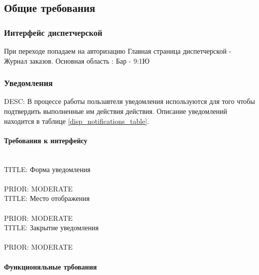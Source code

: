 \subsection{Общие требования}

	\subsubsection{Интерфейс диспетчерской}

		При переходе попадаем на авторизацию
		Главная страница диспетчерской - Журнал заказов. Основная область : Бар - 9:1Ю 





	\subsubsection{Уведомления}

		DESC: В процессе работы пользавтеля уведомления используются для того чтобы подтвердить выполненные им действия действия. Описание уведомлений находится в таблице \ref{disp_notifications_table}.

		\paragraph{Требования к интерфейсу} \mbox{}\\

			TITLE: Форма уведомления\\
			\\
			PRIOR: MODERATE\\

			TITLE: Место отображения\\
			\\
			PRIOR: MODERATE\\

			TITLE: Закрытие уведомления\\
			\\
			PRIOR: MODERATE\\

		\paragraph{Функционяльные трбования} \mbox{} \\

